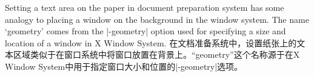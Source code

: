 \begin{paracol}{2}
\switchcolumn
Setting a text area on the paper in document preparation system has some
analogy to placing a window on the background in the window system. 
The name `geometry' comes from the |-geometry| option used for specifying
a size and location of a window in X Window System.
\switchcolumn
在文档准备系统中，设置纸张上的文本区域类似于在窗口系统中将窗口放置在背景上。``geometry''这个名称源于在X Window System中用于指定窗口大小和位置的|-geometry|选项。
\end{paracol}

